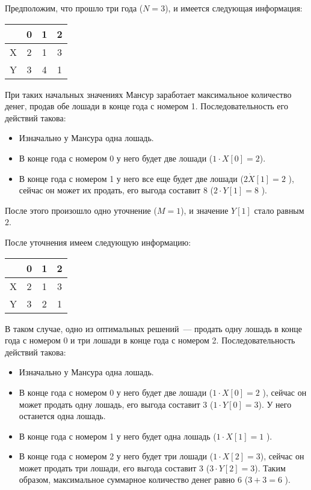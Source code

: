 Предположим, что прошло три года ($N=3$), и имеется следующая информация:
\begin{center}
\begin{tabular}{|c|c|c|c|}
\hline
  & 0 & 1 & 2\\
\hline
X & 2 & 1 & 3\\
\hline
Y & 3 & 4 & 1\\
\hline
\end{tabular}
\end{center}

При таких начальных значениях Мансур заработает максимальное количество денег, продав
обе лошади в конце года с номером 1. Последовательность его действий такова:

\begin{itemize}
\item Изначально у Мансура одна лошадь.
\item В конце года с номером 0 у него будет две лошади ($1 \cdot X[0] = 2$).
\item В конце года с номером 1 у него все еще будет две лошади ($2 \dot X[1] = 2$ ), сейчас он
может их продать, его выгода составит 8 ($2 \cdot Y[1] = 8$ ).
\end{itemize}

После этого произошло одно уточнение ($M=1$), и значение $Y[1]$ стало равным $2$.

После уточнения имеем следующую информацию:
\begin{center}
\begin{tabular}{|c|c|c|c|}
\hline
  & 0 & 1 & 2\\
\hline
X & 2 & 1 & 3\\
\hline
Y & 3 & 2 & 1\\
\hline
\end{tabular}
\end{center}
В таком случае, одно из оптимальных решений~--- продать одну лошадь в конце года с
номером 0 и три лошади в конце года с номером 2. Последовательность действий такова:

\begin{itemize}
\item Изначально у Мансура одна лошадь.
\item В конце года с номером 0 у него будет две лошади ($1 \cdot X[0] = 2$ ), сейчас он может
продать одну лошадь, его выгода составит 3 ($1 \cdot Y[0] = 3$). У него останется одна
лошадь.
\item В конце года с номером 1 у него будет одна лошадь ($1 \cdot X[1] = 1$ ).
\item В конце года с номером 2 у него будет три лошади ($1 \cdot X[2] = 3$), сейчас он может
продать три лошади, его выгода составит 3 ($3 \cdot Y[2] = 3$). Таким образом,
максимальное суммарное количество денег равно 6 ($3 + 3 = 6$ ).
\end{itemize}
